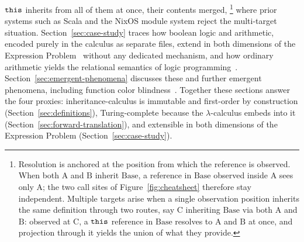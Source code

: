 $\mathtt{this}$ inherits from all of them at once, their contents merged,%
\footnote{
  Resolution is anchored at the position from which the reference is
  observed. When both $\mathrm{A}$ and $\mathrm{B}$ inherit
  $\mathrm{Base}$, a reference in $\mathrm{Base}$ observed inside
  $\mathrm{A}$ sees only $\mathrm{A}$; the two call sites of
  Figure~\ref{fig:cheatsheet} therefore stay independent. Multiple
  targets arise when a single observation position inherits the same
  definition through two routes, say $\mathrm{C}$ inheriting
  $\mathrm{Base}$ via both $\mathrm{A}$ and $\mathrm{B}$: observed at
  $\mathrm{C}$, a $\mathtt{this}$ reference in $\mathrm{Base}$ resolves to
  $\mathrm{A}$ and $\mathrm{B}$ at once, and projection through it
  yields the union of what they provide.
}
where
prior systems
such as Scala and the NixOS module system reject the multi-target
situation.
Section~\ref{sec:case-study} traces how boolean logic and
arithmetic, encoded purely in the calculus as separate files, extend in both
dimensions of the Expression
Problem~\cite{wadler1998-expression-problem} without any dedicated
mechanism, and how ordinary arithmetic yields the relational
semantics of logic
programming~\cite{vanemden1976-predicate-logic-semantics}.
Section~\ref{sec:emergent-phenomena} discusses these and further
emergent phenomena, including function color
blindness~\cite{nystrom2015-function-color}.
Together these sections answer the four proxies: inheritance-calculus
is immutable and first-order by construction
(Section~\ref{sec:definitions}), Turing-complete because the
$\lambda$-calculus embeds into it
(Section~\ref{sec:forward-translation}), and extensible in both
dimensions of the Expression Problem (Section~\ref{sec:case-study}).

